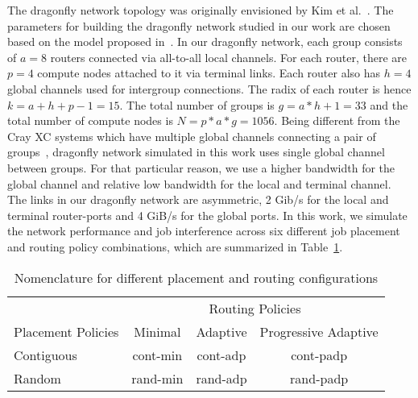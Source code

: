 The dragonfly network topology was originally envisioned by Kim et al.~\cite{kim-micro}. 
The parameters for building the dragonfly network studied in our work are chosen based on the model proposed in~\cite{kim-micro}. 
In our dragonfly network, each group consists of $a = 8$ routers connected via all-to-all local channels. For each router, there are $p = 4$ compute nodes attached to it via terminal links. Each router also has $h = 4$ global channels used for intergroup connections. The radix of each router is hence $k = a+h+p-1 = 15$. 
The total number of groups is $g = a*h+1 = 33 $ and the total number of compute nodes is $N = p*a*g = 1056$. 
Being different from the Cray XC systems which have multiple global channels connecting a pair of groups~\cite{faanes}, dragonfly network simulated in this work uses single global channel between groups. For that particular reason, we use a higher bandwidth for the global channel and relative low bandwidth for the local and terminal channel.
The links in our dragonfly network are asymmetric, 2 Gib/s for the local and terminal router-ports and 4 GiB/s for the global ports.
In this work, we simulate the network performance and job interference across six different job placement and routing policy combinations, which are summarized in Table~\ref{tab: placement routing configs}.


\begin{table}[ht]
\begin{center}
\caption{Nomenclature for different placement and routing configurations} 
\label{tab: placement routing configs}
\begin{tabular}{l c c c }
\toprule %
\toprule
&\multicolumn{3}{c}{Routing Policies} \\ 
\cmidrule(l){2-4}
Placement Policies & Minimal & Adaptive & Progressive Adaptive\\ %
\midrule %
Contiguous  &  cont-min   &  cont-adp    &  cont-padp   \\ %
\midrule
Random  &   rand-min  &   rand-adp   &  rand-padp   \\ 
\midrule %
\bottomrule %
\end{tabular}
\end{center}
\end{table}



